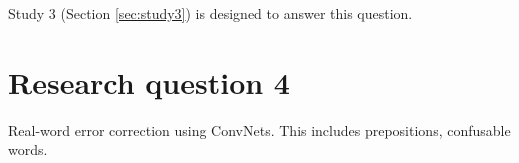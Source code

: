 


Study 3 (Section \ref{sec:study3}) is designed to answer this question.

\section{Research question 4}
\label{sec:question4}

Real-word error correction using ConvNets.  This includes prepositions, confusable words. 



